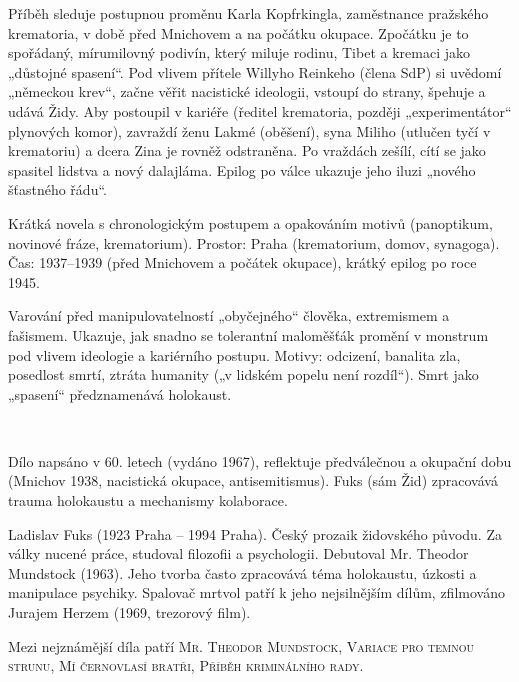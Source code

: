 \documentclass[FGBook.tex]{subfiles}
\begin{document}
\noindent Příběh sleduje postupnou proměnu Karla Kopfrkingla, zaměstnance pražského krematoria, v době před Mnichovem a na počátku okupace. Zpočátku je to spořádaný, mírumilovný podivín, který miluje rodinu, Tibet a kremaci jako „důstojné spasení“. Pod vlivem přítele Willyho Reinkeho (člena SdP) si uvědomí „německou krev“, začne věřit nacistické ideologii, vstoupí do strany, špehuje a udává Židy. Aby postoupil v kariéře (ředitel krematoria, později „experimentátor“ plynových komor), zavraždí ženu Lakmé (oběšení), syna Miliho (utlučen tyčí v krematoriu) a dcera Zina je rovněž odstraněna. Po vraždách zešílí, cítí se jako spasitel lidstva a nový dalajláma. Epilog po válce ukazuje jeho iluzi „nového šťastného řádu“.

\noindent Krátká novela s chronologickým postupem a opakováním motivů (panoptikum, novinové fráze, krematorium). Prostor: Praha (krematorium, domov, synagoga). Čas: 1937–1939 (před Mnichovem a počátek okupace), krátký epilog po roce 1945.

\noindent Varování před manipulovatelností „obyčejného“ člověka, extremismem a fašismem. Ukazuje, jak snadno se tolerantní maloměšťák promění v monstrum pod vlivem ideologie a kariérního postupu. Motivy: odcizení, banalita zla, posedlost smrtí, ztráta humanity („v lidském popelu není rozdíl“). Smrt jako „spasení“ předznamenává holokaust.

\vspace*{2em}\\

\noindent Dílo napsáno v 60. letech (vydáno 1967), reflektuje předválečnou a okupační dobu (Mnichov 1938, nacistická okupace, antisemitismus). Fuks (sám Žid) zpracovává trauma holokaustu a mechanismy kolaborace.

\noindent Ladislav Fuks (1923 Praha – 1994 Praha). Český prozaik židovského původu. Za války nucené práce, studoval filozofii a psychologii. Debutoval Mr. Theodor Mundstock (1963). Jeho tvorba často zpracovává téma holokaustu, úzkosti a manipulace psychiky. Spalovač mrtvol patří k jeho nejsilnějším dílům, zfilmováno Jurajem Herzem (1969, trezorový film).

\noindent Mezi nejznámější díla patří \textsc{Mr. Theodor Mundstock}, \textsc{Variace pro temnou strunu}, \textsc{Mí černovlasí bratři}, \textsc{Příběh kriminálního rady}.
\end{document}
